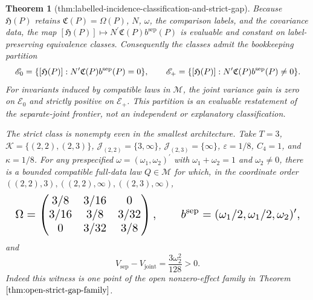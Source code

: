 \documentclass{article}
\newtheorem{theorem}{Theorem}
\begin{document}
\begin{theorem}[thm:labelled-incidence-classification-and-strict-gap]\label{thm:labelled-incidence-classification-and-strict-gap}
Because \(\mathfrak H(P)\) retains \(\mathfrak C(P)=\Omega(P)\), \(N\), \(\omega\), the comparison labels, and the covariance data, the map \([\mathfrak H(P)]\mapsto N^{\prime}\mathfrak C(P)b^{\mathrm{sep}}(P)\) is evaluable and constant on label-preserving equivalence classes. Consequently the classes admit the bookkeeping partition
\[
\makebox[\linewidth][c]{\resizebox{0.98\linewidth}{!}{\(\displaystyle \mathscr E_0=\{[\mathfrak H(P)]:N^{\prime}\mathfrak C(P)b^{\mathrm{sep}}(P)=0\},
 \qquad
 \mathscr E_+=\{[\mathfrak H(P)]:N^{\prime}\mathfrak C(P)b^{\mathrm{sep}}(P)\ne0\}.\)}}
\]
For invariants induced by compatible laws in \(\mathcal M\), the joint variance gain is zero on \(\mathscr E_0\) and strictly positive on \(\mathscr E_+\). This partition is an evaluable restatement of the separate-joint frontier, not an independent or explanatory classification.

The strict class is nonempty even in the smallest architecture. Take \(T=3\), \(\mathcal K=\{(2,2),(2,3)\}\), \(\mathcal J_{(2,2)}=\{3,\infty\}\), \(\mathcal J_{(2,3)}=\{\infty\}\), \(\varepsilon=1/8\), \(C_4=1\), and \(\kappa=1/8\). For any prespecified \(\omega=(\omega_1,\omega_2)^{\prime}\) with \(\omega_1+\omega_2=1\) and \(\omega_2\ne0\), there is a bounded compatible full-data law \(Q\in\mathcal M\) for which, in the coordinate order \(((2,2),3),((2,2),\infty),((2,3),\infty)\),
\[
\makebox[\linewidth][c]{\resizebox{0.98\linewidth}{!}{\(\displaystyle \Omega=
 \begin{pmatrix}
 3/8&3/16&0\\
 3/16&3/8&3/32\\
 0&3/32&3/8
 \end{pmatrix},
 \qquad
 b^{\mathrm{sep}}=(\omega_1/2,\omega_1/2,\omega_2)^{\prime},\)}}
\]
and
\[
 V_{\mathrm{sep}}-V_{\mathrm{joint}}=\frac{3\omega_2^2}{128}>0.
\]
Indeed this witness is one point of the open nonzero-effect family in Theorem \(\ref{thm:open-strict-gap-family}\).
\end{theorem}
\end{document}
